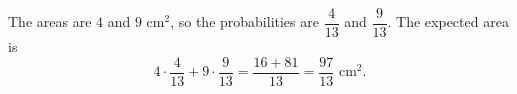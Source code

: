 The areas are $4$ and $9\text{ cm}^2$, so the probabilities are $\dfrac{4}{13}$ and $\dfrac{9}{13}$. The expected area is
\[
4\cdot\dfrac{4}{13}+9\cdot\dfrac{9}{13}=\dfrac{16+81}{13}=\boxed{\dfrac{97}{13}}\text{ cm}^2 .
\]
